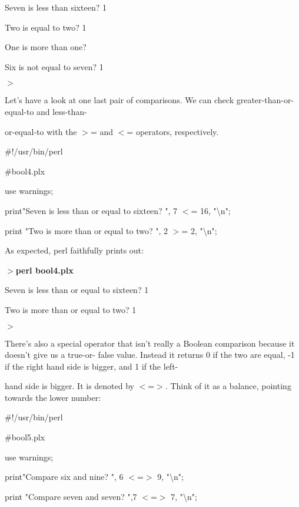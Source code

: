\documentclass[a4paper,11pt]{book}
\begin{document}
\noindent Seven is less than sixteen? 1 

\noindent Two is equal to two? 1

\noindent One is more than one?

\noindent Six is not equal to seven? 1

\noindent $>$

\noindent 

\noindent Let's have a look at one last pair of comparisons. We can check greater-than-or-equal-to and less-than-

\noindent or-equal-to with the $>$= and $<$= operators, respectively.

\noindent 

\noindent 

\noindent \#!/usr/bin/perl

\noindent \#bool4.plx

\noindent use warnings;

\noindent print"Seven is less than or equal to sixteen? ", 7 $<$= 16, "\textbackslash n";

\noindent print "Two is more than or equal to two? ", 2 $>$= 2,  "\textbackslash n";

\noindent 

\noindent As expected, perl faithfully prints out:

\noindent 

\noindent $>$\textbf{perl bool4.plx}

\noindent Seven is less than or equal to sixteen? 1

\noindent Two is more than or equal to two? 1 

\noindent $>$

\noindent 

\noindent There's also a special operator that isn't really a Boolean comparison because it doesn't give us a true-or- false value. Instead it returns 0 if the two are equal, -1 if the right hand side is bigger, and 1 if the left-

\noindent hand side is bigger. It is denoted by $<$=$>$. Think of it as a balance, pointing towards the lower number:

\noindent 

\noindent \#!/usr/bin/perl

\noindent \#bool5.plx

\noindent use warnings;

\noindent print"Compare six and nine? ", 6 $<$=$>$ 9, "\textbackslash n";

\noindent print "Compare seven and seven? ",7 $<$=$>$ 7, "\textbackslash n";
\end{document}
